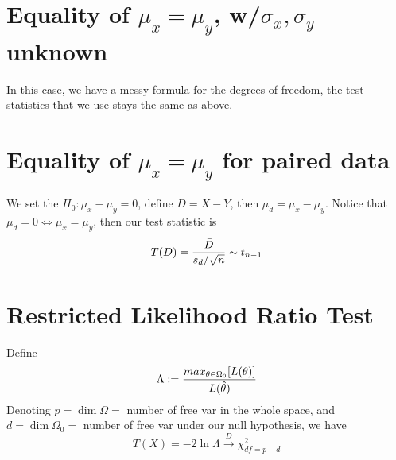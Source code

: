\documentclass{article}
\begin{document}
\section{Equality of $\mu_x = \mu_y$, w/$\sigma_x, \sigma_y$ unknown}
In this case, we have a messy formula for the degrees of freedom, the
test statistics that we use stays the same as above.

\section{Equality of $\mu_x = \mu_y$ for paired data}
We set the $H_0: \mu_x - \mu_y = 0$, define $D = X-Y$, then $\mu_d = \mu_x - \mu_y$. Notice that $\mu_d = 0 \iff \mu_x = \mu_y$, then our test statistic is
\begin{equation*}
    T(D) = \frac{\Bar{D}}{s_d/\sqrt{n}} \sim t_{n-1}
\end{equation*}

\section{Restricted Likelihood Ratio Test}
Define
\begin{equation*}
    \Lambda := \frac{max_{\theta \in 
\Omega_0}[L(\theta)]}{L(\Hat{\theta})}
\end{equation*}
Denoting $p = \dim\Omega =$ number of free var in the whole space, and 
$d = \dim\Omega_0 =$ number of free var under our null hypothesis, we 
have
\begin{equation*}
    T(X) = -2\ln{\Lambda} \xrightarrow{D} \chi^2_{df = p-d}
\end{equation*}
\end{document}
